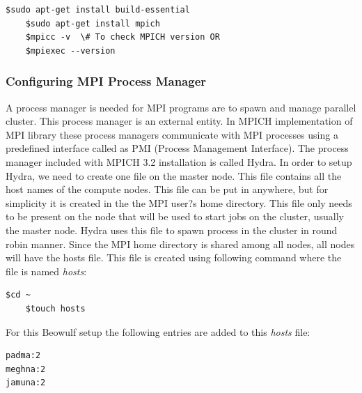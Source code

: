 \begin{lstlisting}[style=BashInputStyle]
	$sudo apt-get install build-essential
	$sudo apt-get install mpich
	$mpicc -v  \# To check MPICH version OR
	$mpiexec --version
\end{lstlisting}

\subsubsection{Configuring MPI Process Manager}
\label{beowulf:process_manager}
A process manager is needed for MPI programs are to spawn and manage parallel cluster. This process manager is an external entity. In MPICH implementation of MPI library these process managers communicate with MPI processes using a predefined interface called as PMI (Process Management Interface). The process manager included with MPICH 3.2 installation is called Hydra.
In order to setup Hydra, we need to create one file on the master node. This file contains all the host names of the compute nodes. This file can be put in anywhere, but for simplicity it is created in the the MPI user?s home directory. This file only needs to be present on the node that will be used to start jobs on the cluster, usually the master node. Hydra uses this file to spawn process in the cluster in round robin manner. Since the MPI home directory is shared among all nodes, all nodes will have the hosts file. This file is created using following command where the file is named \textit{hosts}:

\begin{lstlisting}[style=BashInputStyle]
	$cd ~
	$touch hosts
\end{lstlisting}

For this Beowulf setup the following entries are added to this \textit{hosts} file: 
\begin{lstlisting}[style=BashInputStyle]
padma:2
meghna:2
jamuna:2
\end{lstlisting}


